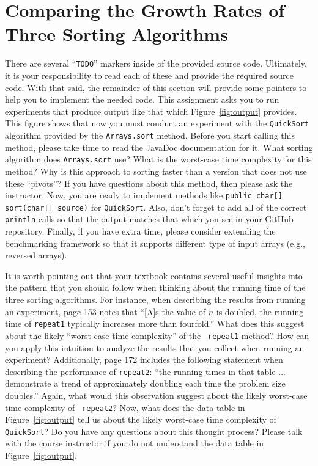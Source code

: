 \documentclass[11pt]{article}
\newcommand{\command}[1]{``\lstinline{#1}''}
\newcommand{\program}[1]{\lstinline{#1}}
\begin{document}
\section*{Comparing the Growth Rates of Three Sorting Algorithms}

There are several \command{TODO} markers inside of the provided source code.
Ultimately, it is your responsibility to read each of these and provide the
required source code. With that said, the remainder of this section will provide
some pointers to help you to implement the needed code. This assignment asks you
to run experiments that produce output like that which Figure~\ref{fig:output}
provides. This figure shows that now you must conduct an experiment with the
\program{QuickSort} algorithm provided by the \program{Arrays.sort} method. Before you
start calling this method, please take time to read the JavaDoc documentation
for it. What sorting algorithm does \program{Arrays.sort} use? What is the
worst-case time complexity for this method? Why is this approach to sorting
faster than a version that does not use these ``pivots''? If you have questions
about this method, then please ask the instructor. Now, you are ready to
implement methods like \program{public char[] sort(char[] source)} for
\program{QuickSort}. Also, don't forget to add all of the correct
\program{println} calls so that the output matches that which you see in your
GitHub repository. Finally, if you have extra time, please consider extending
the benchmarking framework so that it supports different type of input arrays
(e.g., reversed arrays).

It is worth pointing out that your textbook contains several useful insights
into the pattern that you should follow when thinking about the running time of
the three sorting algorithms. For instance, when describing the results from
running an experiment, page 153 notes that ``[A]s the value of $n$ is doubled,
the running time of {\tt repeat1} typically increases more than fourfold.'' What
does this suggest about the likely ``worst-case time complexity'' of the {\tt
repeat1} method? How can you apply this intuition to analyze the results that
you collect when running an experiment? Additionally, page 172 includes the
following statement when describing the performance of {\tt repeat2}: ``the
running times in that table $\ldots$ demonstrate a trend of approximately
doubling each time the problem size doubles.'' Again, what would this
observation suggest about the likely worst-case time complexity of {\tt
repeat2}? Now, what does the data table in Figure~\ref{fig:output} tell us about
the likely worst-case time complexity of \program{QuickSort}? Do you have any
questions about this thought process? Please talk with the course instructor if
you do not understand the data table in Figure~\ref{fig:output}.
\end{document}
